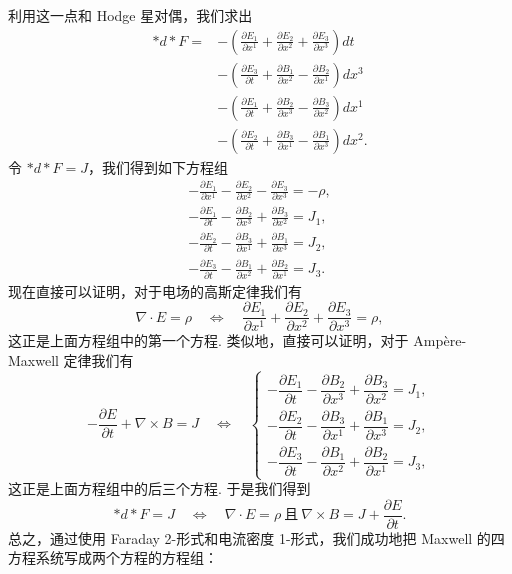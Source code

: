 利用这一点和 Hodge 星对偶，我们求出
\[
\begin{aligned}
\ast d\ast F={}&-\left(\frac{\partial E_1}{\partial x^1}+\frac{\partial E_2}{\partial x^2}+\frac{\partial E_3}{\partial x^3}\right)dt\\
&-\left(\frac{\partial E_3}{\partial t}+\frac{\partial B_1}{\partial x^2}-\frac{\partial B_2}{\partial x^1}\right)dx^3\\
&-\left(\frac{\partial E_1}{\partial t}+\frac{\partial B_2}{\partial x^3}-\frac{\partial B_3}{\partial x^2}\right)dx^1\\
&-\left(\frac{\partial E_2}{\partial t}+\frac{\partial B_3}{\partial x^1}-\frac{\partial B_1}{\partial x^3}\right)dx^2 .
\end{aligned}
\]
令 $\ast d\ast F=J$，我们得到如下方程组
\begin{align*}
-\frac{\partial E_1}{\partial x^1}-\frac{\partial E_2}{\partial x^2}-\frac{\partial E_3}{\partial x^3}=-\rho, \\
-\frac{\partial E_1}{\partial t}-\frac{\partial B_2}{\partial x^3}+\frac{\partial B_3}{\partial x^2}=J_1, \\
-\frac{\partial E_2}{\partial t}-\frac{\partial B_3}{\partial x^1}+\frac{\partial B_1}{\partial x^3}=J_2, \\
-\frac{\partial E_3}{\partial t}-\frac{\partial B_1}{\partial x^2}+\frac{\partial B_2}{\partial x^1}=J_3 .
\end{align*}
现在直接可以证明，对于电场的高斯定律我们有
\[
\nabla\cdot E=\rho\quad\Longleftrightarrow\quad\frac{\partial E_1}{\partial x^1}+\frac{\partial E_2}{\partial x^2}+\frac{\partial E_3}{\partial x^3}=\rho,
\]
这正是上面方程组中的第一个方程. 类似地，直接可以证明，对于 Ampère-Maxwell 定律我们有
\[
-\frac{\partial E}{\partial t}+\nabla\times B=J\quad\Longleftrightarrow\quad
\begin{cases}
-\dfrac{\partial E_1}{\partial t}-\dfrac{\partial B_2}{\partial x^3}+\dfrac{\partial B_3}{\partial x^2}=J_1,\\[4pt]
-\dfrac{\partial E_2}{\partial t}-\dfrac{\partial B_3}{\partial x^1}+\dfrac{\partial B_1}{\partial x^3}=J_2,\\[4pt]
-\dfrac{\partial E_3}{\partial t}-\dfrac{\partial B_1}{\partial x^2}+\dfrac{\partial B_2}{\partial x^1}=J_3,
\end{cases}
\]
这正是上面方程组中的后三个方程. 于是我们得到
\[
\ast d\ast F=J\quad\Longleftrightarrow\quad\nabla\cdot E=\rho\ \text{且}\ \nabla\times B=J+\frac{\partial E}{\partial t}.
\]
总之，通过使用 Faraday 2-形式和电流密度 1-形式，我们成功地把 Maxwell 的四方程系统写成两个方程的方程组：

